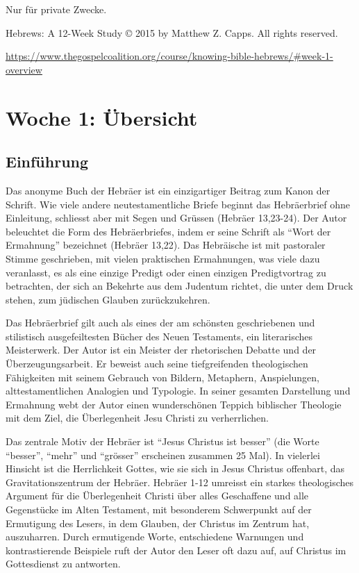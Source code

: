 \documentclass[headsepline=true]{book}
\begin{document}
Nur für private Zwecke.

Hebrews: A 12-Week Study © 2015 by Matthew Z. Capps. All rights
reserved.

\url{https://www.thegospelcoalition.org/course/knowing-bible-hebrews/\#week-1-overview}

\hypertarget{woche01}{\chapter{Woche 1: Übersicht}\label{woche01}}

\section{Einführung}\label{einfuxfchrung}

Das anonyme Buch der Hebräer ist ein einzigartiger Beitrag zum Kanon der
Schrift. Wie viele andere neutestamentliche Briefe beginnt das
Hebräerbrief ohne Einleitung, schliesst aber mit Segen und Grüssen
({Hebräer 13,23-24}). Der Autor beleuchtet die Form des Hebräerbriefes,
indem er seine Schrift als ``Wort der Ermahnung'' bezeichnet ({Hebräer
13,22}). Das Hebräische ist mit pastoraler Stimme geschrieben, mit
vielen praktischen Ermahnungen, was viele dazu veranlasst, es als eine
einzige Predigt oder einen einzigen Predigtvortrag zu betrachten, der
sich an Bekehrte aus dem Judentum richtet, die unter dem Druck stehen,
zum jüdischen Glauben zurückzukehren.

Das Hebräerbrief gilt auch als eines der am schönsten geschriebenen und
stilistisch ausgefeiltesten Bücher des Neuen Testaments, ein
literarisches Meisterwerk. Der Autor ist ein Meister der rhetorischen
Debatte und der Überzeugungsarbeit. Er beweist auch seine tiefgreifenden
theologischen Fähigkeiten mit seinem Gebrauch von Bildern, Metaphern,
Anspielungen, alttestamentlichen Analogien und Typologie. In seiner
gesamten Darstellung und Ermahnung webt der Autor einen wunderschönen
Teppich biblischer Theologie mit dem Ziel, die Überlegenheit Jesu
Christi zu verherrlichen.

Das zentrale Motiv der Hebräer ist ``Jesus Christus ist besser'' (die
Worte ``besser'', ``mehr'' und ``grösser'' erscheinen zusammen 25 Mal).
In vielerlei Hinsicht ist die Herrlichkeit Gottes, wie sie sich in Jesus
Christus offenbart, das Gravitationszentrum der Hebräer. Hebräer 1-12
umreisst ein starkes theologisches Argument für die Überlegenheit
Christi über alles Geschaffene und alle Gegenstücke im Alten Testament,
mit besonderem Schwerpunkt auf der Ermutigung des Lesers, in dem
Glauben, der Christus im Zentrum hat, auszuharren. Durch ermutigende
Worte, entschiedene Warnungen und kontrastierende Beispiele ruft der
Autor den Leser oft dazu auf, auf Christus im Gottesdienst zu antworten.
\end{document}

